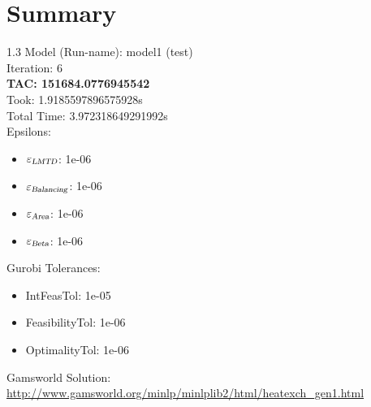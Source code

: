 \documentclass{article}%
\begin{document}
%
\normalsize%
\section{Summary}%
\thispagestyle{plain}%
\begin{spacing}{1.3}%
\Large%
Model (Run-name): model1 (test)\\%
Iteration: 6\\%
\textbf{TAC: 151684.0776945542}\\%
Took: 1.9185597896575928s\\%
Total Time: 3.972318649291992s\\%
Epsilons:%
\begin{itemize}%
	\item $\varepsilon_{\textsl{LMTD}}$: 1e-06%
	\item $\varepsilon_{\textsl{Balancing}}$: 1e-06%
	\item $\varepsilon_{\textsl{Area}}$: 1e-06%
	\item $\varepsilon_{\textsl{Beta}}$: 1e-06%
\end{itemize}%
Gurobi Tolerances:%
\begin{itemize}%
	\item IntFeasTol: 1e-05%
	\item FeasibilityTol: 1e-06%
	\item OptimalityTol: 1e-06%
\end{itemize}%
\end{spacing}%
\normalsize%
Gamsworld Solution: \url{http://www.gamsworld.org/minlp/minlplib2/html/heatexch_gen1.html}%
%
\clearpage%
\end{document}
